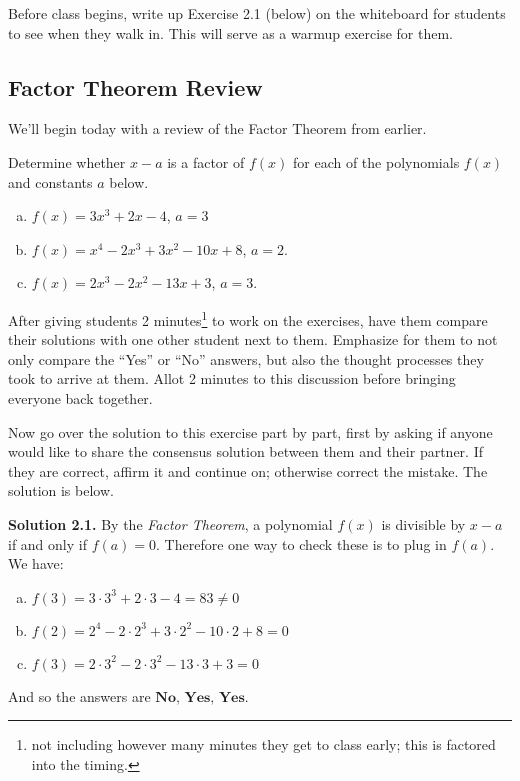 Before class begins, write up Exercise 2.1 (below) on the whiteboard for students to see when they walk in. This will serve as a warmup exercise for them.



\subsection{Factor Theorem Review}

We'll begin today with a review of the Factor Theorem from earlier.

\begin{exercise}
    \label{exc:21}
    Determine whether $x-a$ is a factor of $f(x)$ for each of the polynomials $f(x)$ and constants $a$ below.
    \begin{enumerate}[(a)]
        \item $f(x) = 3x^3 + 2x-4$, $a = 3$
        \item $f(x) = x^4-2x^3+3x^2-10x+8$, $a = 2$.
        \item $f(x) = 2x^3 - 2x^2 - 13x + 3$, $a = 3$.
    \end{enumerate}
\end{exercise}

After giving students 2 minutes\footnote{not including however many minutes they get to class early; this is factored into the timing.} to work on the exercises, have them compare their solutions with one other student next to them. Emphasize for them to not only compare the ``Yes'' or ``No'' answers, but also the thought processes they took to arrive at them. Allot 2 minutes to this discussion before bringing everyone back together.

Now go over the solution to this exercise part by part, first by asking if anyone would like to share the consensus solution between them and their partner. If they are correct, affirm it and continue on; otherwise correct the mistake. The solution is below.

\textbf{Solution 2.1.} By the \emph{Factor Theorem}, a polynomial $f(x)$ is divisible by $x-a$ if and only if $f(a) = 0$. Therefore one way to check these is to plug in $f(a)$. We have:
\begin{enumerate}[(a)]
    \item $f(3) = 3\cdot 3^3 + 2\cdot 3 - 4 = 83 \neq 0$
    \item $f(2) = 2^4 - 2\cdot 2^3 + 3\cdot 2^2 - 10\cdot 2 + 8 = 0$
    \item $f(3) = 2\cdot 3^2 - 2\cdot 3^2 - 13\cdot 3 + 3 = 0$
\end{enumerate} And so the answers are $\boxed{\textbf{No, Yes, Yes}}$.

